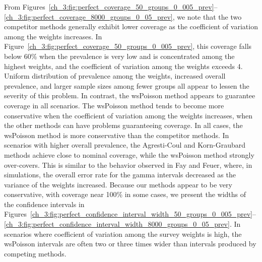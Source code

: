 From Figures~\ref{ch_3:fig:perfect_coverage_50_groups_0_005_prev}--\ref{ch_3:fig:perfect_coverage_8000_groups_0_05_prev}, we note that the two competitor methods generally exhibit lower coverage as the coefficient of variation among the weights increases.
In Figure~\ref{ch_3:fig:perfect_coverage_50_groups_0_005_prev}, this coverage falls below 60\% when the prevalence is very low and is concentrated among the highest weights, and the coefficient of variation among the weights exceeds 4.
Uniform distribution of prevalence among the weights, increased overall prevalence, and larger sample sizes among fewer groups all appear to lessen the severity of this problem.
In contrast, the wsPoisson method appears to guarantee coverage in all scenarios.
The wsPoisson method tends to become more conservative when the coefficient of variation among the weights increases, when the other methods can have problems guaranteeing coverage.
In all cases, the wsPoisson method is more conservative than the competitor methods.
In scenarios with higher overall prevalence, the Agresti-Coul and Korn-Graubard methods achieve close to nominal coverage, while the wsPoisson method strongly over-covers.
This is similar to the behavior observed in Fay and Feuer,\cite{FayF:1997} where, in simulations, the overall error rate for the gamma intervals decreased as the variance of the weights increased.
Because our methods appear to be very conservative, with coverage near 100\% in some cases, we present the widths of the confidence intervals in Figures~\ref{ch_3:fig:perfect_confidence_interval_width_50_groups_0_005_prev}--\ref{ch_3:fig:perfect_confidence_interval_width_8000_groups_0_05_prev}.
In scenarios where coefficient of variation among the survey weights is high, the wsPoisson intervals are often two or three times wider than intervals produced by competing methods.


